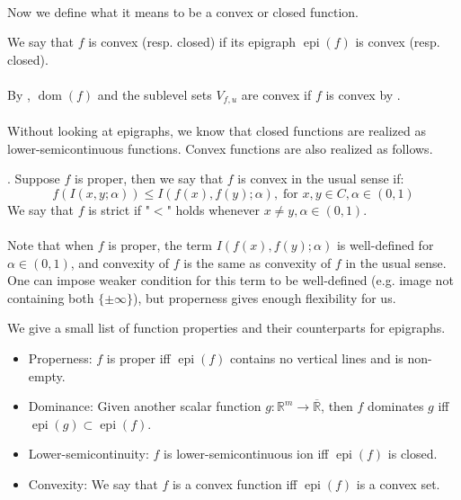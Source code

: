 \paragraph{}Now we define what it means to be a convex or closed function.

\begin{defn}
	\label{defn:021-convex-funcs}
	We say that $f$ is convex (resp. closed) if its epigraph $\operatorname{epi}(f)$ is convex (resp. closed).
\end{defn}

\paragraph{}By , $\operatorname{dom}(f)$ and the sublevel sets $V_{f,u}$ are convex if $f$ is convex by .
\paragraph{}Without looking at epigraphs, we know that closed functions are realized as lower-semicontinuous functions. Convex functions are also realized as follows.

\begin{defn}
	\label{defn:021-conv-usual}.
	Suppose $f$ is proper, then we say that $f$ is convex in the usual sense if:
	\[
		f(I(x,y;\alpha))\leq
		I(f(x),f(y);\alpha),\;\text{for }x,y\in C,\alpha\in(0, 1)
	\]
	We say that $f$ is strict if "$<$" holds whenever $x\neq y,\alpha\in(0,1)$.
\end{defn}

\paragraph{}Note that when $f$ is proper, the term $I(f(x),f(y);\alpha)$ is well-defined for $\alpha \in(0,1)$, and convexity of $f$ is the same as convexity of $f$ in the usual sense. One can impose weaker condition for this term to be well-defined (e.g. image not containing both $\{\pm\infty\}$), but properness gives enough flexibility for us.

\begin{rmrk}We give a small list of function properties and their counterparts for epigraphs.
	\begin{itemize}
		\item Properness: $f$ is proper iff $\operatorname{epi}(f)$ contains no vertical lines and is non-empty.
		\item Dominance: Given another scalar function $g:\mathbb{R}^m\to \overline{\mathbb{R}}$, then $f$ dominates $g$ iff $\operatorname{epi}(g)\subset \operatorname{epi}(f)$.
		\item Lower-semicontinuity: $f$ is lower-semicontinuous ion iff $\operatorname{epi}(f)$ is closed.
		\item Convexity: We say that $f$ is a convex function iff $\operatorname{epi}(f)$ is a convex set.
	\end{itemize}
\end{rmrk}

